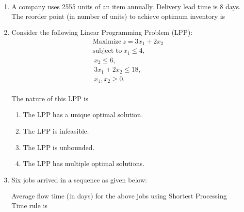 \documentclass[journal]{IEEEtran}
\begin{document}
\begin{enumerate}[leftmargin=0pt]
\item A company uses 2555 units of an item annually. Delivery lead time is 8 days. The reorder point (in number of units) to achieve optimum inventory is
\begin{enumerate}
\hfill{}
\end{enumerate}

\item Consider the following Linear Programming Problem (LPP):
\begin{align*}
  \text{Maximize} \ z = 3x_1 + 2x_2 \\ \text{subject  to}\  x_1 \leq 4,\\\ x_2 \leq 6,\\\ 3x_1 + 2x_2 \leq 18,\\\ x_1, x_2 \geq 0.
\end{align*}
\\     The nature of this LPP is
\begin{enumerate}
  \item The LPP has a unique optimal solution.
  \item The LPP is infeasible.
  \item The LPP is unbounded.
  \item The LPP has multiple optimal solutions.
\hfill{}
\end{enumerate}
\newpage
\item Six jobs arrived in a sequence as given below:\\
\begin{table}[h]
    \centering
    
\end{table}

Average flow time (in days) for the above jobs using Shortest Processing Time rule is
\begin{enumerate}
\hfill{}
\end{enumerate}


\end{enumerate}
\end{document}
